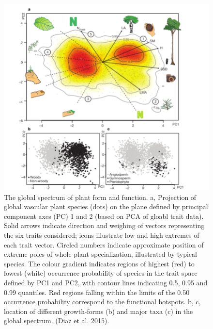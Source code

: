 \documentclass[
  12pt,
  oneside]{book}
\begin{document}
\begin{figure}

{\centering \includegraphics[width=0.8\linewidth]{figures/chap7/f77_PES} 

}

\caption{The global spectrum of plant form and function. a, Projection of global vascular plant species (dots) on the plane defined by principal component axes (PC) 1 and 2 (based on PCA of gloabl trait data). Solid arrows indicate direction and weighing of vectors representing the six traits considered; icons illustrate low and high extremes of each trait vector. Circled numbers indicate approximate position of extreme poles of whole-plant specialization, illustrated by typical species. The colour gradient indicates regions of highest (red) to lowest (white) occurrence probability of species in the trait space defined by PC1 and PC2, with contour lines indicating 0.5, 0.95 and 0.99 quantiles. Red regions falling within the limits of the 0.50 occurrence probability correspond to the functional hotspots. b, c, location of different growth-forms (b) and major taxa (c) in the global spectrum. (Diaz et al. 2015).}\label{fig:f77}
\end{figure}
\end{document}
